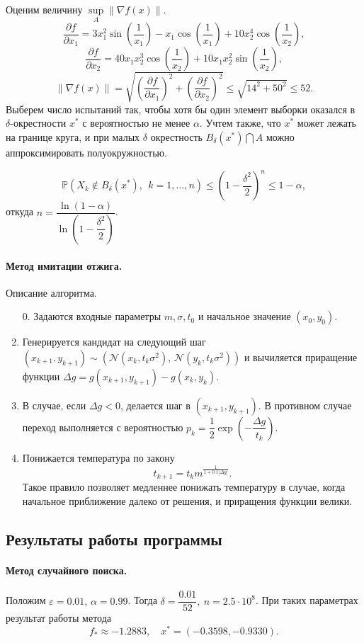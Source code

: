 \documentclass[16pt]{article}
\begin{document}
Оценим величину $\sup\limits_A \|\nabla f(x)\|$.
$$\dfrac{\partial f}{\partial x_1} = 3x_1^2\sin\left(\dfrac{1}{x_1}\right) - x_1\cos\left(\dfrac{1}{x_1}\right) + 10x_2^4\cos\left(\dfrac{1}{x_2}\right),$$
$$\dfrac{\partial f}{\partial x_2} = 40x_1x_2^3 \cos\left(\dfrac{1}{x_2}\right) + 10x_1x_2^2\sin\left(\dfrac{1}{x_2}\right),$$
$$\|\nabla f(x)\| = \sqrt{\left(\dfrac{\partial f}{\partial x_1}\right)^2 + \left(\dfrac{\partial f}{\partial x_2}\right)^2} \leq \sqrt{14^2 + 50^2} \leq 52.$$
Выберем число испытаний так, чтобы хотя бы один элемент выборки оказался в $\delta$-окрестности $x^*$ с вероятностью не менее $\alpha$. Учтем также, что $x^*$ может лежать на границе круга, и при малых $\delta$ окрестность $B_\delta(x^*) \bigcap A$ можно аппроксимировать полуокружностью.

$$\mathbb{P}(X_k \notin B_\delta(x^*), \ \ k = 1, \ldots, n) \leq \left(1 - \dfrac{\delta^2}{2}\right)^n \leq 1 - \alpha,$$
откуда $n = \dfrac{\ln(1 - \alpha)}{\ln\left(1 - \dfrac{\delta^2}{2}\right)}$.
\paragraph{Метод имитации отжига.}
Описание алгоритма.
\begin{enumerate}
	\item[0.] Задаются входные параметры $m, \sigma, t_0$ и начальное значение $(x_0, y_0)$.
	\item Генерируется кандидат на следующий шаг $(x_{k+1}, y_{k+1}) \sim (\mathcal{N}(x_k, t_k\sigma^2),\, \mathcal{N}(y_k, t_k\sigma^2))$ и вычиляется приращение функции $\Delta g = g(x_{k+1}, y_{k+1}) - g(x_k, y_k)$.
	\item В случае, если $\Delta g < 0$, делается шаг в $(x_{k+1}, y_{k+1})$.
В противном случае переход выполняется с вероятностью 
$p_k = \dfrac12\exp\left(-\dfrac{\Delta g}{t_k}\right)$.
	\item Понижается температура по закону
$$t_{k+1} = t_k m^{\frac{1}{1+0.1|\Delta g|}}.$$
Такое правило позволяет медленнее понижать температуру в случае, когда начальное приближение далеко от решения, и приращения функции велики.
\end{enumerate}

\subsection{Результаты работы программы}
\paragraph{Метод случайного поиска.}
Положим $\varepsilon = 0.01,\, \alpha = 0.99$. Тогда $\delta = \dfrac{0.01}{52}, \ n = 2.5 \cdot 10^8$.
При таких параметрах результат работы метода 
$$f_* \approx -1.2883, \quad x^* = (-0.3598, -0.9330).$$
\end{document}
